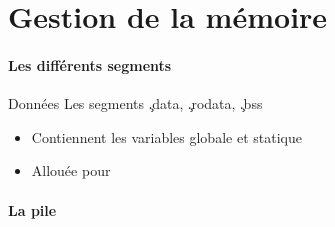 %
%
%

\part{Gestion de la mémoire}


\begin{frame}
  \partpage
\end{frame}

\begin{frame}
  \tableofcontents[currentpart]
\end{frame}

\subsection{Les différents segments}

\begin{frame}[fragile=singleslide]{Données}
  Les segments \c{.data}, \c{.rodata}, \c{.bss}
  \begin{itemize}
  \item Contiennent les variables globale et statique
  \item Allouée pour 
  \end{itemize}
\end{frame}

\subsection{La pile}

